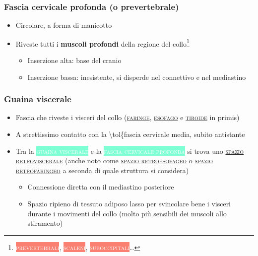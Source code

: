 \documentclass[italian,]{article}
\providecommand{\tightlist}{%
  \setlength{\itemsep}{0pt}\setlength{\parskip}{0pt}}
\newcommand{\mus}[1]{\colorbox{Salmon}{\textcolor{white}{\textsc{#1}}}}
\newcommand{\tol}[1]{\colorbox{Aquamarine}{\textcolor{white}{\textsc{#1}}}}
\renewcommand{\a}[1]{\underline{\textsc{#1}}}
\begin{document}
\hypertarget{fascia-cervicale-profonda-o-prevertebrale}{%
\subsubsection{Fascia cervicale profonda (o
prevertebrale)}\label{fascia-cervicale-profonda-o-prevertebrale}}

\begin{itemize}
\tightlist
\item
  Circolare, a forma di manicotto
\item
  Riveste tutti i \textbf{muscoli profondi} della regione del
  collo\footnote{\mus{prevertebrali}, \mus{scaleni},
    \mus{suboccipitali}\ldots{}}

  \begin{itemize}
  \tightlist
  \item
    Inserzione alta: base del cranio
  \item
    Inserzione bassa: inesistente, si disperde nel connettivo e nel
    mediastino
  \end{itemize}
\end{itemize}

\hypertarget{guaina-viscerale}{%
\subsubsection{Guaina viscerale}\label{guaina-viscerale}}

\begin{itemize}
\tightlist
\item
  Fascia che riveste i visceri del collo (\a{faringe}, \a{esofago} e
  \a{tiroide} in primis)
\item
  A strettissimo contatto con la \textbackslash{}tol\{fascia cervicale
  media, subito antistante
\item
  Tra la \tol{guaina viscerale} e la \tol{fascia cervicale profonda} si
  trova uno \a{spazio retroviscerale} (anche noto come
  \a{spazio retroesofageo} o \a{spazio retrofaringeo} a seconda di quale
  struttura si considera)

  \begin{itemize}
  \tightlist
  \item
    Connessione diretta con il mediastino posteriore
  \item
    Spazio ripieno di tessuto adiposo lasso per svincolare bene i
    visceri durante i movimenti del collo (molto più sensibili dei
    muscoli allo stiramento)
  \end{itemize}
\end{itemize}
\end{document}
